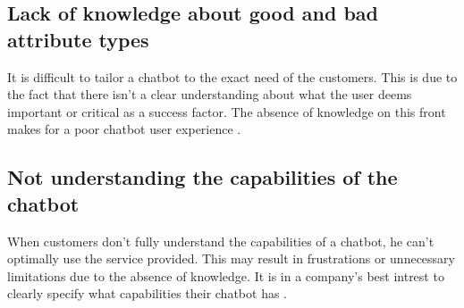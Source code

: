 \subsection{Lack of knowledge about good and bad attribute types}
It is difficult to tailor a chatbot to the exact need of the customers. This is due to the fact that there isn't a clear understanding about what the user deems important or critical as a success factor. The absence of knowledge on this front makes for a poor chatbot user experience \citep{brandtzaeg2020}.

\subsection{Not understanding the capabilities of the chatbot}
When customers don't fully understand the capabilities of a chatbot, he can't optimally use the service provided. This may result in frustrations or unnecessary limitations due to the absence of knowledge. It is in a company's best intrest to clearly specify what capabilities their chatbot has \citep{brandtzaeg2020}.

